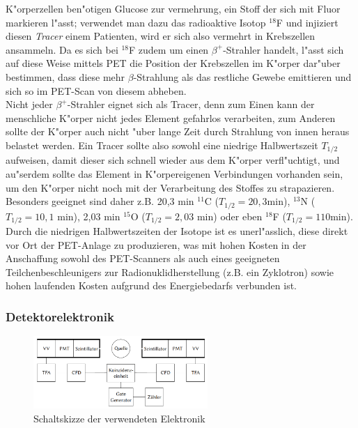 \documentclass{article}
\begin{document}
K"orperzellen ben"otigen Glucose zur vermehrung, ein Stoff der sich mit Fluor markieren l"asst; verwendet man dazu das radioaktive Isotop $^{18}$F und injiziert diesen \textit{Tracer} einem Patienten, wird er sich also vermehrt in Krebszellen ansammeln. Da es sich bei $^{18}$F zudem um einen $\beta^+$-Strahler handelt, l"asst sich auf diese Weise mittels PET die Position der Krebszellen im K"orper dar"uber bestimmen, dass diese mehr $\beta$-Strahlung als das restliche Gewebe emittieren und sich so im PET-Scan von diesem abheben.\\
Nicht jeder $\beta^+$-Strahler eignet sich als Tracer, denn zum Einen kann der menschliche K"orper nicht jedes Element gefahrlos verarbeiten, zum Anderen sollte der K"orper auch nicht "uber lange Zeit durch Strahlung von innen heraus belastet werden. Ein Tracer sollte also sowohl eine niedrige Halbwertszeit $T_{1/2}$ aufweisen, damit dieser sich schnell wieder aus dem K"orper verfl"uchtigt, und au"serdem sollte das Element in K"orpereigenen Verbindungen vorhanden sein, um den K"orper nicht noch mit der Verarbeitung des Stoffes zu strapazieren. Besonders geeignet sind daher z.B. 20,3 min $^{11}$C ($T_{1/2}=20,3$min), $^{13}$N ($T_{1/2}=10,1$ min), 2,03 min $^{15}$O ($T_{1/2}=2,03$ min) oder eben $^{18}$F ($T_{1/2}=110$min). Durch die niedrigen Halbwertszeiten der Isotope ist es unerl"asslich, diese direkt vor Ort der PET-Anlage zu produzieren, was mit hohen Kosten in der Anschaffung sowohl des PET-Scanners als auch eines geeigneten Teilchenbeschleunigers zur Radionuklidherstellung (z.B. ein Zyklotron) sowie hohen laufenden Kosten aufgrund des Energiebedarfs verbunden ist.





\subsubsection{Detektorelektronik}


\begin{figure}[!ht]
	\centering
	\includegraphics[width=250px, totalheight=250px, keepaspectratio]{elektronik.PNG}
	\caption[Schaltskizze der verwendeten Elektronik]{Schaltskizze der verwendeten Elektronik\footnotemark}
	\label{figElektronik}
\end{figure}
\end{document}
